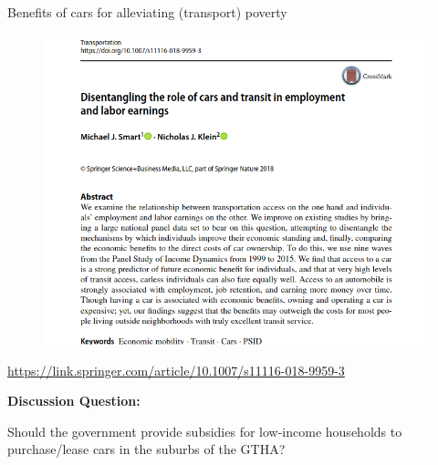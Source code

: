 \documentclass[aspectratio=169]{beamer}
\begin{document}
\begin{frame}
	
	Benefits of cars for alleviating (transport) poverty
	
	\begin{figure}
		\centering
		\includegraphics[width=0.64\linewidth]{images/klein_smart_cars.png}
	\end{figure}

	\tiny\url{https://link.springer.com/article/10.1007/s11116-018-9959-3}
	
\end{frame}


%
%
%
%
%
%





\begin{frame}
	
	\textbf{Discussion Question:}
	
	\vspace{2mm}
	
	Should the government provide subsidies for low-income households to purchase/lease cars in the suburbs of the GTHA?
	
\end{frame}
\end{document}
